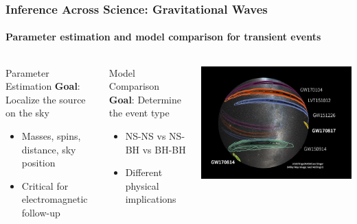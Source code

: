 \documentclass[aspectratio=169]{beamer}
\newcommand{\keyterm}[1]{\textbf{\textcolor{C0}{#1}}}
\begin{document}
\begin{frame}
    \frametitle{Inference Across Science: Gravitational Waves}
    \framesubtitle{Parameter estimation and model comparison for transient events}
    \begin{columns}[T]
        \begin{block}{Parameter Estimation}
            \keyterm{Goal}: Localize the source on the sky
            \begin{itemize}
                \item Masses, spins, distance, sky position
                \item Critical for electromagnetic follow-up
            \end{itemize}
        \end{block}
        \begin{block}{Model Comparison}
            \keyterm{Goal}: Determine the event type
            \begin{itemize}
                \item NS-NS vs NS-BH vs BH-BH
                \item Different physical implications
            \end{itemize}
        \end{block}
        \includegraphics[width=\textwidth]{figures/gw_localisation.jpg}
    \end{columns}
\end{frame}
\end{document}
